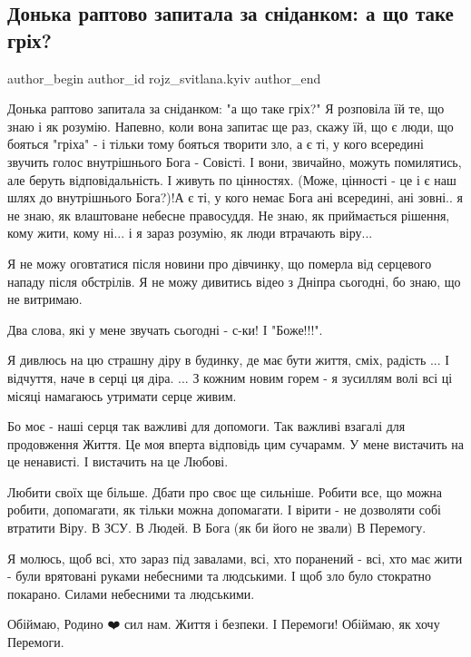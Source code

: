  
 
 
 
 

\subsection{Донька раптово запитала за сніданком: а що таке гріх?}
\label{sec:14_01_2023.fb.rojz_svitlana.kyiv.1.donka_raptovo_zapita}

\ifcmt
 author_begin
   author_id rojz_svitlana.kyiv
 author_end
\fi

Донька раптово запитала за сніданком: "а що таке гріх?" Я розповіла їй те, що
знаю і як розумію. Напевно, коли вона запитає ще раз, скажу їй, що є люди, що
бояться "гріха" - і тільки тому бояться творити зло, а є ті, у кого всередині
звучить голос внутрішнього Бога - Совісті. І вони, звичайно,  можуть
помилятись, але беруть відповідальність. І живуть по цінностях. (Може, цінності
- це і є наш шлях до внутрішнього Бога?)!А є ті, у кого немає Бога ані
всередині, ані зовні..  я не знаю, як влаштоване небесне правосуддя. Не знаю,
як приймається рішення, кому жити, кому ні... і я зараз розумію, як люди
втрачають віру... 

Я не можу оговтатися після новини про дівчинку, що померла від серцевого нападу
після обстрілів. Я не можу дивитись відео з Дніпра сьогодні, бо знаю, що не
витримаю. 

Два слова, які у мене звучать сьогодні - с-ки! І "Боже!!!". 

Я дивлюсь на цю страшну діру в будинку, де має бути життя, сміх, радість ... І
відчуття, наче в серці ця діра. ... З кожним новим горем - я зусиллям волі всі
ці місяці намагаюсь утримати серце живим. 

Бо моє - наші серця так важливі для допомоги. Так важливі взагалі для
продовження Життя. Це моя вперта відповідь цим сучарамм. У мене вистачить на це
ненависті. І вистачить на це Любові.  

Любити своїх ще більше. Дбати про своє ще сильніше. Робити все, що можна
робити, допомагати, як тільки можна допомагати. І вірити - не дозволяти собі
втратити Віру. В ЗСУ. В Людей. В Бога (як би його не звали) В Перемогу.

Я молюсь, щоб всі, хто зараз під завалами, всі, хто поранений - всі, хто має
жити - були врятовані руками небесними та людськими. І щоб зло було стократно
покарано. Силами небесними та людськими. 

Обіймаю, Родино ❤️ сил нам. Життя і безпеки.  І Перемоги! Обіймаю, як хочу
Перемоги.
